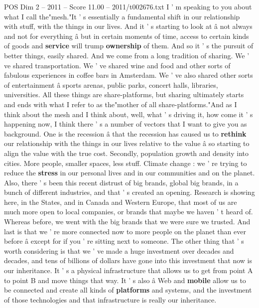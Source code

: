 \begin{textsample}{POS Dim 2 – 2011 – Score 11.00 – 2011/t002676.txt}  \label{ex:f2_pos_083}
I ' m speaking to you about what I call the"mesh."It ' s essentially a fundamental shift in our relationship with stuff, with the things in our lives.
And it ' s starting to look at â not always and not for everything â but in certain moments of time, access to certain kinds of goods and \textbf{service} will trump \textbf{ownership} of them.
And so it ' s the pursuit of better things, easily shared.
And we come from a long tradition of sharing.
We ' ve shared transportation.
We ' ve shared wine and food and other sorts of fabulous experiences in coffee bars in Amsterdam.
We ' ve also shared other sorts of entertainment â sports arenas, public parks, concert halls, libraries, universities.
All these things are share-platforms, but sharing ultimately starts and ends with what I refer to as the"mother of all share-platforms."And as I think about the mesh and I think about, well, what ' s driving it, how come it ' s happening now, I think there ' s a number of vectors that I want to give you as background.
One is the recession â that the recession has caused us to \textbf{rethink} our relationship with the things in our lives relative to the value â so starting to align the value with the true cost.
Secondly, population growth and density into cities.
More people, smaller spaces, less stuff.
Climate change : we ' re trying to reduce the \textbf{stress} in our personal lives and in our communities and on the planet.
Also, there ' s been this recent distrust of big brands, global big brands, in a bunch of different industries, and that ' s created an opening.
Research is showing here, in the States, and in Canada and Western Europe, that most of us are much more open to local companies, or brands that maybe we haven ' t heard of.
Whereas before, we went with the big brands that we were sure we trusted.
And last is that we ' re more connected now to more people on the planet than ever before â except for if you ' re sitting next to someone.
The other thing that ' s worth considering is that we ' ve made a huge investment over decades and decades, and tens of billions of dollars have gone into this investment that now is our inheritance.
It ' s a physical infrastructure that allows us to get from point A to point B and move things that way.
It ' s also â Web and \textbf{mobile} allow us to be connected and create all kinds of \textbf{platforms} and systems, and the investment of those technologies and that infrastructure is really our inheritance.

\end{textsample}
